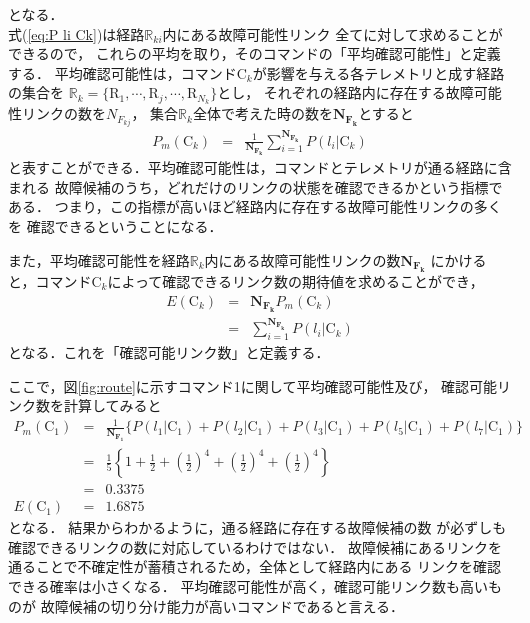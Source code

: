 \documentclass[11pt]{jsreport}
\begin{document}
となる．\\
式(\ref{eq:P li Ck})は経路$\mathbb{R}_{ki}$内にある故障可能性リンク
全てに対して求めることができるので，
これらの平均を取り，そのコマンドの「平均確認可能性」と定義する．
平均確認可能性は，コマンドC$_k$が影響を与える各テレメトリと成す経路の集合を
$\mathbb{R}_{k} = \{ \text{R}_{1}, \cdots , \text{R}_{j},\cdots ,\text{R}_{N_{k}} \}$とし，
それぞれの経路内に存在する故障可能性リンクの数を$N_{F_{kj}}$，
集合$\mathbb{R}_{k}$全体で考えた時の数を$\mathbf{N_{F_k}}$とすると
\begin{eqnarray}
   P_m(\text{C}_k) &=& \frac{1}{\mathbf{N_{F_k}}}\sum_{i=1}^{\mathbf{N_{F_k}}}P(l_i|\text{C}_k)
\end{eqnarray} %
と表すことができる．平均確認可能性は，コマンドとテレメトリが通る経路に含まれる
故障候補のうち，どれだけのリンクの状態を確認できるかという指標である．
つまり，この指標が高いほど経路内に存在する故障可能性リンクの多くを
確認できるということになる．%

また，平均確認可能性を経路$\mathbb{R}_{k}$内にある故障可能性リンクの数$\mathbf{N_{F_k}}$
にかけると，コマンドC$_k$によって確認できるリンク数の期待値を求めることができ，
\begin{eqnarray}
   E(\text{C}_k) &=& \mathbf{N_{F_k}}P_m(\text{C}_k)\\
   &=& \sum_{i=1}^{\mathbf{N_{F_k}}}P(l_i|\text{C}_k)
\end{eqnarray} 
となる．これを「確認可能リンク数」と定義する．

ここで，図\ref{fig:route}に示すコマンド1に関して平均確認可能性及び，
確認可能リンク数を計算してみると
\begin{eqnarray}
   P_m(\text{C}_1) &=& \frac{1}{\mathbf{N_{F_1}}} \{P(l_{1} | \text{C}_1) + P(l_{2} | \text{C}_1) +P(l_{3} | \text{C}_1)
   +P(l_{5} | \text{C}_1) + P(l_{7} | \text{C}_1)\} \\
   &=& \frac{1}{5} \left\{ 1 + \frac{1}{2} + \left( \frac{1}{2}\right)^4 + \left( \frac{1}{2}\right)^4
    + \left( \frac{1}{2}\right)^4 \right\}\\
    &=& 0.3375 \\
   E(\text{C}_1)  &=& 1.6875
\end{eqnarray} 
となる．
結果からわかるように，通る経路に存在する故障候補の数
が必ずしも確認できるリンクの数に対応しているわけではない．
故障候補にあるリンクを通ることで不確定性が蓄積されるため，全体として経路内にある
リンクを確認できる確率は小さくなる．
平均確認可能性が高く，確認可能リンク数も高いものが
故障候補の切り分け能力が高いコマンドであると言える．
\end{document}
